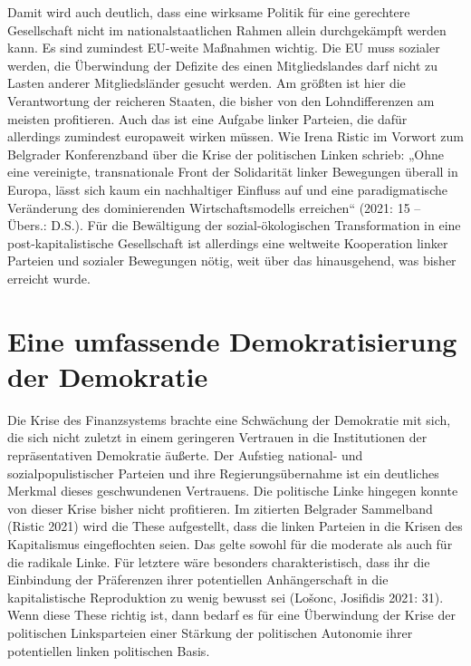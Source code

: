 \begin{multicols*}{2}
Damit wird auch deutlich, dass eine wirksame Politik für eine gerechtere Gesellschaft nicht im nationalstaatlichen Rahmen allein durchgekämpft werden kann. Es sind zumindest EU-weite Maßnahmen wichtig. Die EU muss sozialer werden, die Überwindung der Defizite des einen Mitgliedslandes darf nicht zu Lasten anderer Mitgliedsländer gesucht werden. Am größten ist hier die Verantwortung der reicheren Staaten, die bisher von den Lohndifferenzen am meisten profitieren. Auch das ist eine Aufgabe linker Parteien, die dafür allerdings zumindest europaweit wirken müssen. Wie Irena Ristic im Vorwort zum Belgrader Konferenzband über die Krise der politischen Linken schrieb: „Ohne eine vereinigte, transnationale Front der Solidarität linker Bewegungen überall in Europa, lässt sich kaum ein nachhaltiger Einfluss auf und eine paradigmatische Veränderung des dominierenden Wirtschaftsmodells erreichen“ (2021: 15 – Übers.: D.S.). Für die Bewältigung der sozial-ökologischen Transformation in eine post-kapitalistische Gesellschaft ist allerdings eine weltweite Kooperation linker Parteien und sozialer Bewegungen nötig, weit über das hinausgehend, was bisher erreicht wurde.  

\section{Eine umfassende Demokratisierung der Demokratie}

\noindent Die Krise des Finanzsystems brachte eine Schwächung der Demokratie mit sich, die sich nicht zuletzt in einem geringeren Vertrauen in die Institutionen der repräsentativen Demokratie äußerte. Der Aufstieg national- und sozialpopulistischer Parteien und ihre Regierungsübernahme ist ein deutliches Merkmal dieses geschwundenen Vertrauens. Die politische Linke hingegen konnte von dieser Krise bisher nicht profitieren. Im zitierten Belgrader Sammelband (Ristic 2021) wird die These aufgestellt, dass die linken Parteien in die Krisen des Kapitalismus eingeflochten seien. Das gelte sowohl für die moderate als auch für die radikale Linke. Für letztere wäre besonders charakteristisch, dass ihr die Einbindung der Präferenzen ihrer potentiellen Anhängerschaft in die kapitalistische Reproduktion zu wenig bewusst sei (Lošonc, Josifidis 2021: 31). Wenn diese These richtig ist, dann bedarf es für eine Überwindung der Krise der politischen Linksparteien einer Stärkung der politischen Autonomie ihrer potentiellen linken politischen Basis. 


\end{multicols*}
